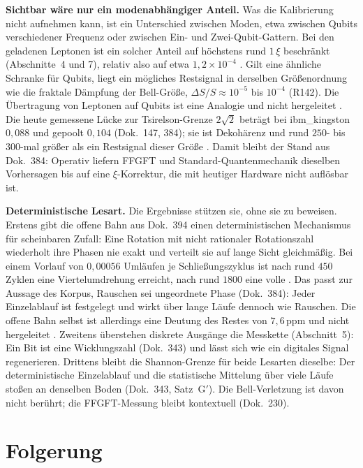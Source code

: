 \textbf{Sichtbar wäre nur ein modenabhängiger Anteil.} Was die Kalibrierung nicht aufnehmen kann, ist ein
Unterschied zwischen Moden, etwa zwischen Qubits verschiedener Frequenz oder zwischen Ein- und
Zwei-Qubit-Gattern. Bei den geladenen Leptonen ist ein solcher Anteil auf höchstens rund $1\,\xi$
beschränkt (Abschnitte~4 und 7), relativ also auf etwa $1{,}2\times10^{-4}$ \KM. Gilt eine ähnliche
Schranke für Qubits, liegt ein mögliches Restsignal in derselben Größenordnung wie die fraktale
Dämpfung der Bell-Größe, $\Delta S/S\approx10^{-5}$ bis $10^{-4}$ (R142). Die Übertragung von Leptonen
auf Qubits ist eine Analogie und nicht hergeleitet \SM. Die heute gemessene Lücke zur Tsirelson-Grenze
$2\sqrt2$ beträgt bei ibm\_kingston $0{,}088$ und gepoolt $0{,}104$ (Dok.~147, 384); sie ist Dekohärenz
und rund $250$- bis $300$-mal größer als ein Restsignal dieser Größe \KM. Damit bleibt der Stand aus
Dok.~384: Operativ liefern FFGFT und Standard-Quantenmechanik dieselben Vorhersagen bis auf eine
$\xi$-Korrektur, die mit heutiger Hardware nicht auflösbar ist.

\textbf{Deterministische Lesart.} Die Ergebnisse stützen sie, ohne sie zu beweisen. Erstens gibt die
offene Bahn aus Dok.~394 einen deterministischen Mechanismus für scheinbaren Zufall: Eine Rotation mit
nicht rationaler Rotationszahl wiederholt ihre Phasen nie exakt und verteilt sie auf lange Sicht
gleichmäßig. Bei einem Vorlauf von $0{,}00056$ Umläufen je Schließungszyklus ist nach rund $450$ Zyklen
eine Viertelumdrehung erreicht, nach rund $1800$ eine volle \KM. Das passt zur Aussage des Korpus,
Rauschen sei ungeordnete Phase (Dok.~384): Jeder Einzelablauf ist festgelegt und wirkt über lange Läufe
dennoch wie Rauschen. Die offene Bahn selbst ist allerdings eine Deutung des Restes von $7{,}6$\,ppm
und nicht hergeleitet \SM. Zweitens überstehen diskrete Ausgänge die Messkette (Abschnitt~5): Ein Bit
ist eine Wicklungszahl (Dok.~343) und lässt sich wie ein digitales Signal regenerieren. Drittens bleibt
die Shannon-Grenze für beide Lesarten dieselbe: Der deterministische Einzelablauf und die
statistische Mittelung über viele Läufe stoßen an denselben Boden (Dok.~343, Satz~G$'$). Die
Bell-Verletzung ist davon nicht berührt; die FFGFT-Messung bleibt kontextuell (Dok.~230).

\section{Folgerung}

